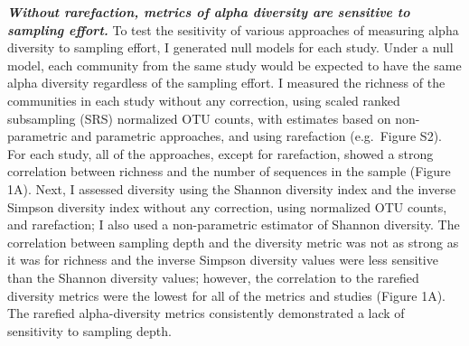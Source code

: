 \documentclass[
]{article}
\begin{document}
\textbf{\emph{Without rarefaction, metrics of alpha diversity are
sensitive to sampling effort.}} To test the sesitivity of various
approaches of measuring alpha diversity to sampling effort, I generated
null models for each study. Under a null model, each community from the
same study would be expected to have the same alpha diversity regardless
of the sampling effort. I measured the richness of the communities in
each study without any correction, using scaled ranked subsampling (SRS)
normalized OTU counts, with estimates based on non-parametric and
parametric approaches, and using rarefaction (e.g.~Figure S2). For each
study, all of the approaches, except for rarefaction, showed a strong
correlation between richness and the number of sequences in the sample
(Figure 1A). Next, I assessed diversity using the Shannon diversity
index and the inverse Simpson diversity index without any correction,
using normalized OTU counts, and rarefaction; I also used a
non-parametric estimator of Shannon diversity. The correlation between
sampling depth and the diversity metric was not as strong as it was for
richness and the inverse Simpson diversity values were less sensitive
than the Shannon diversity values; however, the correlation to the
rarefied diversity metrics were the lowest for all of the metrics and
studies (Figure 1A). The rarefied alpha-diversity metrics consistently
demonstrated a lack of sensitivity to sampling depth.
\end{document}
